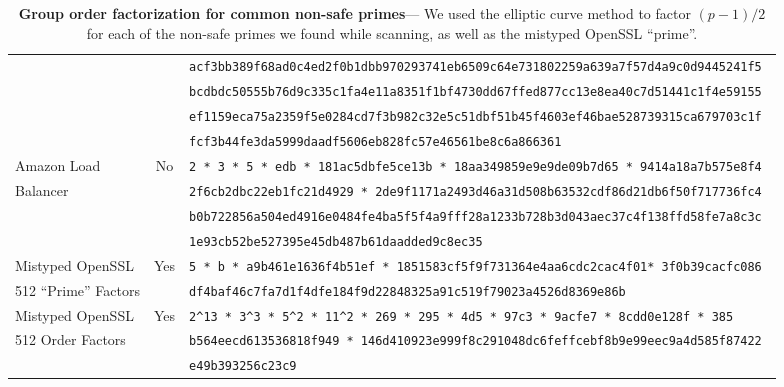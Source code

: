 {\begin{table*}[ht]
\begin{tabularx}{\textwidth}{lcl}
                              &   & \tt acf3bb389f68ad0c4ed2f0b1dbb970293741eb6509c64e731802259a639a7f57d4a9c0d9445241f5 \\
                              &   & \tt bcdbdc50555b76d9c335c1fa4e11a8351f1bf4730dd67ffed877cc13e8ea40c7d51441c1f4e59155 \\
                              &   & \tt ef1159eca75a2359f5e0284cd7f3b982c32e5c51dbf51b45f4603ef46bae528739315ca679703c1f \\
                              &   & \tt fcf3b44fe3da5999daadf5606eb828fc57e46561be8c6a866361 \\
        Amazon Load           & No & \tt 2 * 3 * 5 * edb * 181ac5dbfe5ce13b * 18aa349859e9e9de09b7d65 * 9414a18a7b575e8f4 \\
        Balancer              &   & \tt 2f6cb2dbc22eb1fc21d4929 * 2de9f1171a2493d46a31d508b63532cdf86d21db6f50f717736fc4 \\
                              &   & \tt b0b722856a504ed4916e0484fe4ba5f5f4a9fff28a1233b728b3d043aec37c4f138ffd58fe7a8c3c \\
                              &   & \tt 1e93cb52be527395e45db487b61daadded9c8ec35 \\
        Mistyped OpenSSL      & Yes & \tt 5 * b * a9b461e1636f4b51ef * 1851583cf5f9f731364e4aa6cdc2cac4f01* 3f0b39cacfc086 \\
        512 ``Prime'' Factors &   & \tt df4baf46c7fa7d1f4dfe184f9d22848325a91c519f79023a4526d8369e86b \\
        Mistyped OpenSSL      & Yes & \tt 2\^{}13 * 3\^{}3 * 5\^{}2 * 11\^{}2 * 269 * 295 * 4d5 * 97c3 * 9acfe7 * 8cdd0e128f * 385 \\
        512 Order Factors     &   & \tt b564eecd613536818f949 * 146d410923e999f8c291048dc6feffcebf8b9e99eec9a4d585f87422 \\
                              &   & \tt e49b393256c23c9 \\
        \bottomrule
    \end{tabularx}
    \caption{\textbf{Group order factorization for common non-safe primes}---%
    We used the elliptic curve method to factor $(p-1)/2$ for each of the
    non-safe primes we found while scanning, as well as the mistyped OpenSSL
    ``prime''.
    }
    \label{tab:group-order-factorization}
\end{table*}
}

